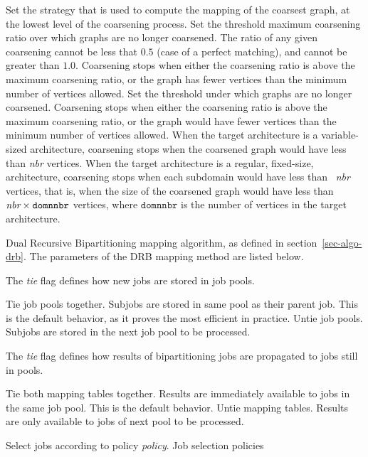 \begin{itemize}
\begin{itemize}
Set the strategy that is used to compute the mapping of the
coarsest graph, at the lowest level of the coarsening process.
\iteme[{\tt rat=}{\it rat}]
Set the threshold maximum coarsening ratio over which graphs are no longer
coarsened. The ratio of any given coarsening cannot be less that $0.5$
(case of a perfect matching), and cannot be greater than $1.0$.
Coarsening stops when either the coarsening ratio is above the maximum
coarsening ratio, or the graph has fewer vertices than the minimum number of
vertices allowed.
\iteme[{\tt vert=}{\it nbr}]
Set the threshold under which graphs are no longer
coarsened. Coarsening stops when either the coarsening ratio is above
the maximum coarsening ratio, or the graph would have fewer vertices
than the minimum number of vertices allowed. When the target
architecture is a variable-sized architecture, coarsening stops when
the coarsened graph would have less than \mbox{\it nbr} vertices. When
the target architecture is a regular, fixed-size, architecture,
coarsening stops when each subdomain would have less than \mbox{\it
  nbr} vertices, that is, when the size of the coarsened graph would
have less than $\mbox{\it nbr}\times\mathtt{domnnbr}$ vertices,
where $\mathtt{domnnbr}$ is the number of vertices in the target
architecture.
\end{itemize}
\iteme[{\tt r}]
Dual Recursive Bipartitioning mapping algorithm, as defined in
section~\ref{sec-algo-drb}. The parameters of the DRB mapping method are
listed below.
\begin{itemize}
\iteme[{\tt job=}{\it tie}]
The {\it tie\/} flag defines how new jobs are stored in job pools.
\begin{itemize}
\iteme[{\tt t}]
Tie job pools together. Subjobs are stored in same pool as their parent job.
This is the default behavior, as it proves the most efficient in practice.
\iteme[{\tt u}]
Untie job pools. Subjobs are stored in the next job pool to be processed.
\end{itemize}
\iteme[{\tt map=}{\it tie}]
The {\it tie\/} flag defines how results of bipartitioning jobs are
propagated to jobs still in pools.
\begin{itemize}
\iteme[{\tt t}]
Tie both mapping tables together. Results are immediately available to jobs
in the same job pool. This is the default behavior.
\iteme[{\tt u}]
Untie mapping tables. Results are only available to jobs of next pool to be
processed.
\end{itemize}
\iteme[{\tt poli=}{\it policy}]
Select jobs according to policy {\it policy}. Job selection policies

\end{itemize}
\end{itemize}
